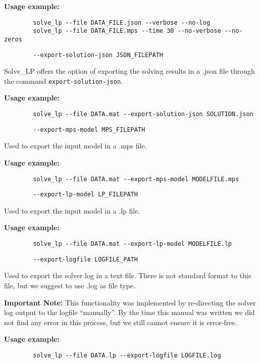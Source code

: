 \documentclass[12pt,hidelinks]{article}
\begin{document}
	\textbf{Usage example:} 
	\begin{verbatim}
		solve_lp --file DATA_FILE.json --verbose --no-log
		solve_lp --file DATA_FILE.mps --time 30 --no-verbose --no-zeros
	\end{verbatim}

	{\color{mordantred19}
	\begin{verbatim}
		--export-solution-json JSON_FILEPATH
	\end{verbatim}
	} Solve\_LP offers the option of exporting the solving results in a .json file through the command \texttt{export-solution-json}.
	
	\textbf{Usage example:} 
	\begin{verbatim}
		solve_lp --file DATA.mat --export-solution-json SOLUTION.json
	\end{verbatim}

	{\color{mordantred19}
	\begin{verbatim}
		--export-mps-model MPS_FILEPATH
	\end{verbatim}
	} Used to export the input model in a .mps file.
	
	\textbf{Usage example:} 
	\begin{verbatim}
		solve_lp --file DATA.mat --export-mps-model MODELFILE.mps
	\end{verbatim}

	{\color{mordantred19}
	\begin{verbatim}
		--export-lp-model LP_FILEPATH
	\end{verbatim}
	} Used to export the input model in a .lp file.
	
	\textbf{Usage example:} 
	\begin{verbatim}
		solve_lp --file DATA.mat --export-lp-model MODELFILE.lp
	\end{verbatim}

	{\color{mordantred19}
	\begin{verbatim}
		--export-logfile LOGFILE_PATH
	\end{verbatim}
	} Used to export the solver log in a text file. There is not standard format to this file, but we suggest to use .log as file type.

	\textbf{Important Note:} This functionality was implemented by re-directing the solver log output to the logfile ``manually''. By the time this manual was written we did not find any error in this process, but we still cannot ensure it is error-free.
	
	\textbf{Usage example:} 
	\begin{verbatim}
		solve_lp --file DATA.lp --export-logfile LOGFILE.log
	\end{verbatim}
\end{document}
